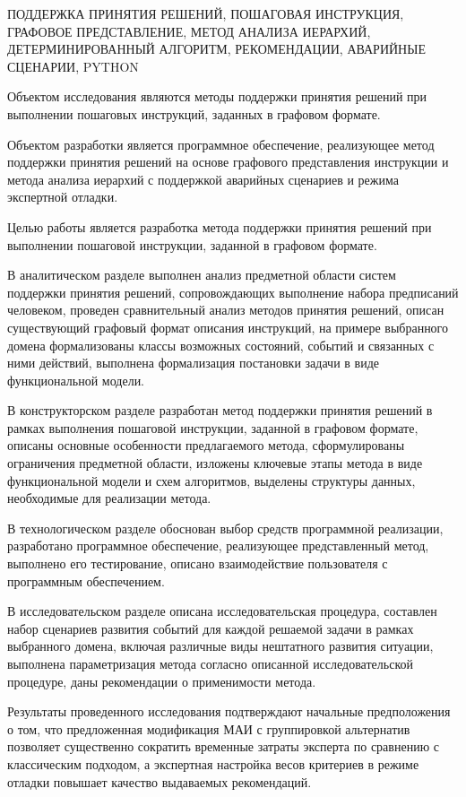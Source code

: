 \begin{essay}{}
	
ПОДДЕРЖКА ПРИНЯТИЯ РЕШЕНИЙ, ПОШАГОВАЯ ИНСТРУКЦИЯ, ГРАФОВОЕ ПРЕДСТАВЛЕНИЕ, МЕТОД АНАЛИЗА ИЕРАРХИЙ, ДЕТЕРМИНИРОВАННЫЙ АЛГОРИТМ, РЕКОМЕНДАЦИИ, АВАРИЙНЫЕ СЦЕНАРИИ, PYTHON

Объектом исследования являются методы поддержки принятия решений при выполнении пошаговых инструкций, заданных в графовом формате.

Объектом разработки является программное обеспечение, реализующее метод поддержки принятия решений на основе графового представления инструкции и метода анализа иерархий с поддержкой аварийных сценариев и режима экспертной отладки.

Целью работы является разработка метода поддержки принятия решений при выполнении пошаговой инструкции, заданной в графовом формате.

В аналитическом разделе выполнен анализ предметной области систем поддержки принятия решений, сопровождающих выполнение набора предписаний человеком, проведен сравнительный анализ методов принятия решений, описан существующий графовый формат описания инструкций, на примере выбранного домена формализованы классы возможных состояний, событий и связанных с ними действий, выполнена формализация постановки задачи в виде функциональной модели.

В конструкторском разделе разработан метод поддержки принятия решений в рамках выполнения пошаговой инструкции, заданной в графовом формате, описаны основные особенности предлагаемого метода, сформулированы ограничения предметной области, изложены ключевые этапы метода в виде функциональной модели и схем алгоритмов, выделены структуры данных, необходимые для реализации метода.

В технологическом разделе обоснован выбор средств программной реализации, разработано программное обеспечение, реализующее представленный метод, выполнено его тестирование, описано взаимодействие пользователя с программным обеспечением.

В исследовательском разделе описана исследовательская процедура, составлен набор сценариев развития событий для каждой решаемой задачи в рамках выбранного домена, включая различные виды нештатного развития ситуации, выполнена параметризация метода согласно описанной исследовательской процедуре, даны рекомендации о применимости метода.

Результаты проведенного исследования подтверждают начальные предположения о том, что предложенная модификация МАИ с группировкой альтернатив позволяет существенно сократить временные затраты эксперта по сравнению с классическим подходом, а экспертная настройка весов критериев в режиме отладки повышает качество выдаваемых рекомендаций.
\end{essay}